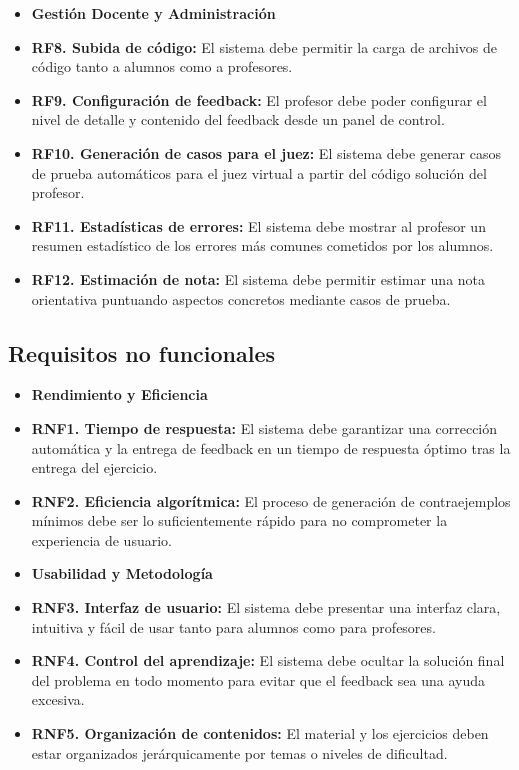 \begin{itemize}
    \item[] \textbf{Gestión Docente y Administración}
    \item \textbf{RF8. Subida de código:} El sistema debe permitir la carga de archivos de código tanto a alumnos como a profesores.
    \item \textbf{RF9. Configuración de feedback:} El profesor debe poder configurar el nivel de detalle y contenido del feedback desde un panel de control.
    \item \textbf{RF10. Generación de casos para el juez:} El sistema debe generar casos de prueba automáticos para el juez virtual a partir del código solución del profesor.
    \item \textbf{RF11. Estadísticas de errores:} El sistema debe mostrar al profesor un resumen estadístico de los errores más comunes cometidos por los alumnos.
    \item \textbf{RF12. Estimación de nota:} El sistema debe permitir estimar una nota orientativa puntuando aspectos concretos mediante casos de prueba.
\end{itemize}

\subsection{Requisitos no funcionales}
\begin{itemize}
    \item[] \textbf{Rendimiento y Eficiencia}
    \item \textbf{RNF1. Tiempo de respuesta:} El sistema debe garantizar una corrección automática y la entrega de feedback en un tiempo de respuesta óptimo tras la entrega del ejercicio.
    \item \textbf{RNF2. Eficiencia algorítmica:} El proceso de generación de contraejemplos mínimos debe ser lo suficientemente rápido para no comprometer la experiencia de usuario.
    
    \item[] \textbf{Usabilidad y Metodología}
    \item \textbf{RNF3. Interfaz de usuario:} El sistema debe presentar una interfaz clara, intuitiva y fácil de usar tanto para alumnos como para profesores.
    \item \textbf{RNF4. Control del aprendizaje:} El sistema debe ocultar la solución final del problema en todo momento para evitar que el feedback sea una ayuda excesiva.
    \item \textbf{RNF5. Organización de contenidos:} El material y los ejercicios deben estar organizados jerárquicamente por temas o niveles de dificultad.
\end{itemize}
